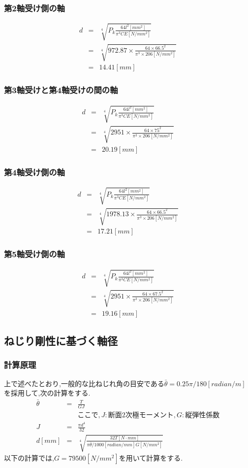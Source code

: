 \documentclass[a4j,twoside,openright,11pt]{jreport}
\begin{document}
\subsubsection{第2軸受け側の軸}
\begin{eqnarray}
d&=&\sqrt[4]{P_k\frac{64l^2[mm^2]}{\pi^3CE[N/mm^2]}}\\
 &=&\sqrt[4]{972.87 \times \frac{64\times 66.5^2}{\pi^3 \times 206[N/mm^2]}}\\
 &=&14.41[mm]
\end{eqnarray}
\subsubsection{第3軸受けと第4軸受けの間の軸}
\begin{eqnarray}
d&=&\sqrt[4]{P_k\frac{64l^2[mm^2]}{\pi^3CE[N/mm^2]}}\\
 &=&\sqrt[4]{2951 \times \frac{64\times 75^2}{\pi^3 \times 206[N/mm^2]}}\\
 &=&20.19[mm]
\end{eqnarray}
\subsubsection{第4軸受け側の軸}
\begin{eqnarray}
d&=&\sqrt[4]{P_k\frac{64l^2[mm^2]}{\pi^3CE[N/mm^2]}}\\
 &=&\sqrt[4]{1978.13 \times \frac{64\times 66.5^2}{\pi^3 \times 206[N/mm^2]}}\\
 &=&17.21[mm]
\end{eqnarray}
\subsubsection{第5軸受け側の軸}
\begin{eqnarray}
d&=&\sqrt[4]{P_k\frac{64l^2[mm^2]}{\pi^3CE[N/mm^2]}}\\
 &=&\sqrt[4]{2951 \times \frac{64\times 67.5^2}{\pi^3 \times 206[N/mm^2]}}\\
 &=&19.16[mm]
\end{eqnarray}

\subsection{ねじり剛性に基づく軸径}
\subsubsection{計算原理}
上で述べたとおり,一般的な比ねじれ角の目安である$\bar{\theta} = 0.25\pi /180 [radian/m]$を採用して,次の計算をする.
\begin{eqnarray}
\bar{\theta} &=& \frac{T}{GJ}\\
&&ここで,J:断面2次極モーメント,G:縦弾性係数\\
J&=&\frac{\pi d^4}{32}\\
d[mm]&=&\sqrt[4]{\frac{32T[N \cdot mm]}{\pi \bar{\theta}/1000[radian/mm] G[N/mm^2]}}
\end{eqnarray}
以下の計算では,$G=79500[N/mm^2]$を用いて計算をする.
\end{document}

